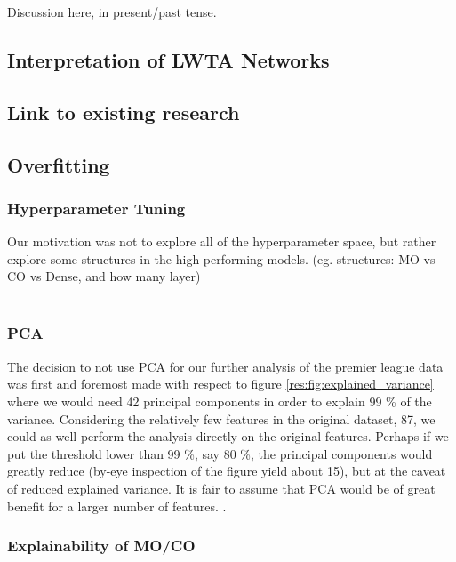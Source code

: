 Discussion here, in present/past tense.

\subsection{Interpretation of LWTA Networks}


\subsection{Link to existing research}


\subsection{Overfitting}


\subsubsection{Hyperparameter Tuning}
    Our motivation was not to explore all of the hyperparameter space, but rather explore some structures in the high performing models. (eg. structures: MO vs CO vs Dense, and how many layer)
     \\
     \\

\subsubsection{PCA}
    The decision to not use PCA for our further analysis of the premier league data was first and foremost made with respect to figure \ref{res:fig:explained_variance} where we would need 42 principal components in order to explain 99 \% of the variance. Considering the relatively few features in the original dataset, 87, we could as well perform the analysis directly on the original features. Perhaps if we put the threshold lower than 99 \%, say 80 \%, the principal components would greatly reduce (by-eye inspection of the figure yield about 15), but at the caveat of reduced explained variance. It is fair to assume that PCA would be of great benefit for a larger number of features. . 
    

\subsubsection{Explainability of MO/CO}
